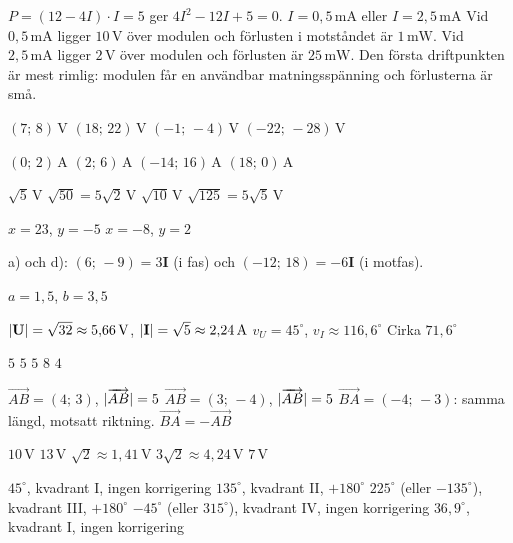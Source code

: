 
\begin{facit}

  $P = (12 - 4I) \cdot I = 5$ ger $4I^2 - 12I + 5 = 0$.
 $I = 0{,}5\,\text{mA}$ eller $I = 2{,}5\,\text{mA}$
 Vid $0{,}5\,\text{mA}$ ligger $10\,\text{V}$ över modulen och förlusten i motståndet är
$1\,\text{mW}$. Vid $2{,}5\,\text{mA}$ ligger $2\,\text{V}$ över modulen och förlusten är
$25\,\text{mW}$. Den första driftpunkten är mest rimlig: modulen får en användbar matningsspänning
och förlusterna är små.

  $(7;\, 8)\,\text{V}$  $(18;\, 22)\,\text{V}$  $(-1;\, -4)\,\text{V}$
 $(-22;\, -28)\,\text{V}$

  $(0;\, 2)\,\text{A}$  $(2;\, 6)\,\text{A}$  $(-14;\, 16)\,\text{A}$  $(18;\, 0)\,\text{A}$

  $\sqrt{5}\,\text{V}$  $\sqrt{50} = 5\sqrt{2}\,\text{V}$  $\sqrt{10}\,\text{V}$
 $\sqrt{125} = 5\sqrt{5}\,\text{V}$

  $x = 23$, $y = -5$  $x = -8$, $y = 2$

 a) och d): $(6;\, -9) = 3\mathbf{I}$ (i fas) och $(-12;\, 18) = -6\mathbf{I}$ (i motfas).

 $a = 1{,}5$, $b = 3{,}5$

  $\lvert\mathbf{U}\rvert = \sqrt{32} \approx 5{,}66\,\text{V}$, $\lvert\mathbf{I}\rvert = \sqrt{5} \approx 2{,}24\,\text{A}$
 $v_U = 45^{\circ}$, $v_I \approx 116{,}6^{\circ}$  Cirka $71{,}6^{\circ}$

  $5$  $5$  $5$  $8$  $4$

  $\overrightarrow{AB} = (4;\, 3)$, $\lvert\overrightarrow{AB}\rvert = 5$
 $\overrightarrow{AB} = (3;\, -4)$, $\lvert\overrightarrow{AB}\rvert = 5$
 $\overrightarrow{BA} = (-4;\, -3)$: samma längd, motsatt riktning.
 $\overrightarrow{BA} = -\overrightarrow{AB}$

  $10\,\text{V}$  $13\,\text{V}$  $\sqrt{2} \approx 1{,}41\,\text{V}$
 $3\sqrt{2} \approx 4{,}24\,\text{V}$  $7\,\text{V}$

  $45^{\circ}$, kvadrant I, ingen korrigering
 $135^{\circ}$, kvadrant II, $+180^{\circ}$
 $225^{\circ}$ (eller $-135^{\circ}$), kvadrant III, $+180^{\circ}$
 $-45^{\circ}$ (eller $315^{\circ}$), kvadrant IV, ingen korrigering
 $36{,}9^{\circ}$, kvadrant I, ingen korrigering


\end{facit}

